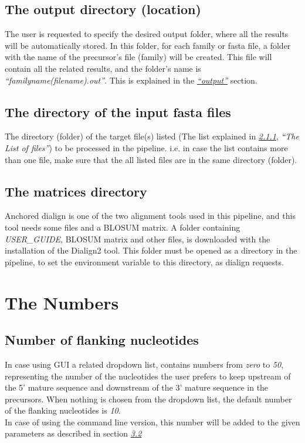 \documentclass[a4paper,20pt]{report}
\begin{document}
\subsection{The output directory (location)}
\label{sec:output}
\noindent
The user is requested to specify the desired output folder, where all the results will be automatically stored.
In this folder, for each family or fasta file, a folder with the name of the precursor's file (family) will be created.
This file will contain all the related results, and the folder's name is \textit{``familyname(filename).out''}. 
This is explained in the \hyperref[chap:outputs]{\textit{``output''}} section.
\subsection{The directory of the input fasta files}
\label{sec:filesdir}
\noindent
The directory (folder) of the target file(s) listed (The list explained in \hyperref[sec:fastafile]{\textit{2.1.1}}, 
\textit{``The List of files''}) to be processed in the pipeline. i.e. in case the list contains 
more than one file, make sure that the all listed files are in the same directory (folder).
\subsection{The matrices directory}
\label{sec:matrix}
\noindent
Anchored dialign is one of the two alignment tools used in this pipeline, and this tool needs some files and a BLOSUM matrix. A folder containing \textit{USER\_GUIDE}, BLOSUM
matrix and other files, is downloaded with the installation of the Dialign2 tool. This folder must be opened as a directory in the pipeline, to set the environment variable 
to this directory, as dialign requests.
\section{The Numbers} 
\subsection{Number of flanking nucleotides}
\label{sec:flanking}
\noindent
In case using GUI a related dropdown list, contains numbers from \textit{zero} to \textit{50}, representing the number 
of the nucleotides the user prefers to keep upstream of the 5' mature sequence and downstream of the 3' mature sequence 
in the precursors. When nothing is chosen from the dropdown list, the default number of the flanking nucleotides is \textit{10}.\\
In case of using the command line version, this number will be added to the given parameters as described in section \hyperref[sec:cmnd]{\textit{3.2}}
\end{document}
